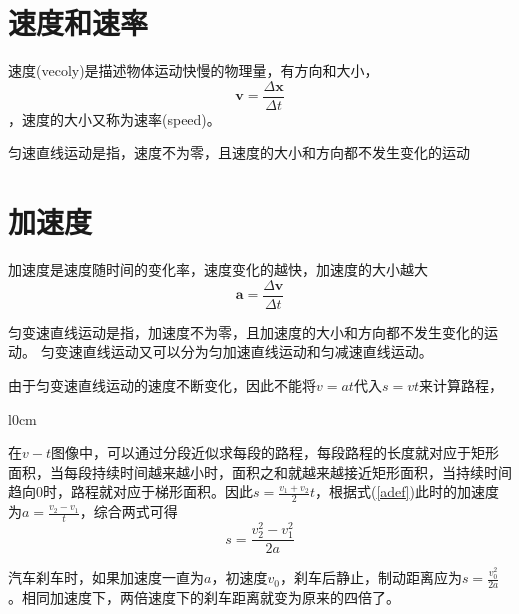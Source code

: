 \section{速度和速率}
速度(vecoly)是描述物体运动快慢的物理量，有方向和大小，
\begin{equation}\label{vdef}
\bm{v}=\frac{\Delta \bm{x}}{\Delta t}
\end{equation}，速度的大小又称为速率(speed)。

匀速直线运动是指，速度不为零，且速度的大小和方向都不发生变化的运动

\section{加速度}
加速度是速度随时间的变化率，速度变化的越快，加速度的大小越大
\begin{equation}\label{adef}
\bm{a}=\frac{\Delta \bm{v}}{\Delta t}
\end{equation}

匀变速直线运动是指，加速度不为零，且加速度的大小和方向都不发生变化的运动。
匀变速直线运动又可以分为匀加速直线运动和匀减速直线运动。

由于匀变速直线运动的速度不断变化，因此不能将$v=at$代入$s=vt$来计算路程，

\begin{wrapfigure}{l}{0cm}
\end{wrapfigure}

在$v-t$图像中，可以通过分段近似求每段的路程，每段路程的长度就对应于矩形面积，当每段持续时间越来越小时，面积之和就越来越接近矩形面积，当持续时间趋向0时，路程就对应于梯形面积。因此$s=\frac{v_1+v_2}{2}t$，根据式(\ref{adef})此时的加速度为$a=\frac{v_2-v_1}{t}$，综合两式可得
\begin{equation}\label{consta_path}
s=\frac{v_2^2-v_1^2}{2a}
\end{equation}

汽车刹车时，如果加速度一直为$a$，初速度$v_0$，刹车后静止，制动距离应为$s=\frac{v_0^2}{2a}$。相同加速度下，两倍速度下的刹车距离就变为原来的四倍了。


